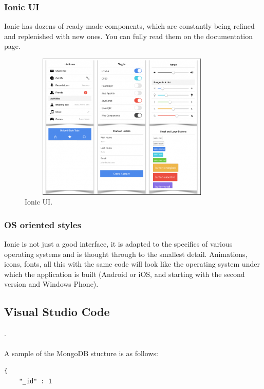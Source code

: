 \subsubsection{Ionic UI}
Ionic has dozens of ready-made components, which are constantly being refined and replenished with new ones. You can fully read them on the documentation page.\cite{IonicUI}

\begin{figure}[h]
\centering
\includegraphics[width=10cm, height=7cm]{img/IonicUI.png}
\caption{Ionic UI.}
\end{figure}

\subsubsection{OS oriented styles}
Ionic is not just a good interface, it is adapted to the specifics of various operating systems and is thought through to the smallest detail. Animations, icons, fonts, all this with the same code will look like the operating system under which the application is built (Android or iOS, and starting with the second version and Windows Phone).\cite{IonicOS}

\subsection{Visual Studio Code}
\cite{mLab}.\\
\\
A sample of the MongoDB stucture is as follows\cite{WilliamZola}:
\begin{verbatim}
{
    "_id" : 1

\end{verbatim}

